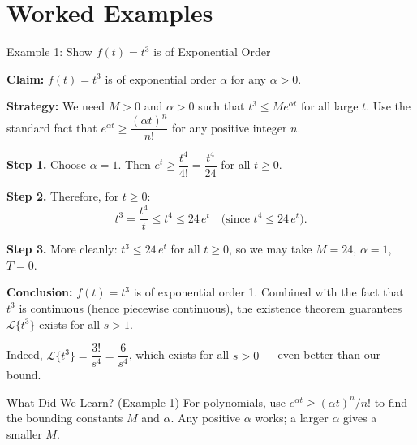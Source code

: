 \documentclass[12pt,a4paper]{article}
\begin{document}
\section{Worked Examples}

\begin{infobox}{Example 1: Show $f(t) = t^3$ is of Exponential Order}

\textbf{Claim:} $f(t) = t^3$ is of exponential order $\alpha$ for any $\alpha > 0$.

\textbf{Strategy:} We need $M > 0$ and $\alpha > 0$ such that $t^3 \leq M e^{\alpha t}$ for all large $t$. Use the standard fact that $e^{\alpha t} \geq \dfrac{(\alpha t)^n}{n!}$ for any positive integer $n$.

\textbf{Step 1.} Choose $\alpha = 1$. Then $e^{t} \geq \dfrac{t^4}{4!} = \dfrac{t^4}{24}$ for all $t \geq 0$.

\textbf{Step 2.} Therefore, for $t \geq 0$:
\[
  t^3 = \frac{t^4}{t} \leq t^4 \leq 24\, e^{t} \quad \text{(since } t^4 \leq 24\, e^t \text{)}.
\]

\textbf{Step 3.} More cleanly: $t^3 \leq 24\, e^{t}$ for all $t \geq 0$, so we may take $M = 24$, $\alpha = 1$, $T = 0$.

\textbf{Conclusion:} $f(t) = t^3$ is of exponential order 1. Combined with the fact that $t^3$ is continuous (hence piecewise continuous), the existence theorem guarantees $\mathcal{L}\{t^3\}$ exists for all $s > 1$.

Indeed, $\mathcal{L}\{t^3\} = \dfrac{3!}{s^4} = \dfrac{6}{s^4}$, which exists for all $s > 0$ --- even better than our bound.
\end{infobox}

\begin{learnbox}{What Did We Learn? (Example 1)}
For polynomials, use $e^{\alpha t} \geq (\alpha t)^n / n!$ to find the bounding constants $M$ and $\alpha$. Any positive $\alpha$ works; a larger $\alpha$ gives a smaller $M$.
\end{learnbox}
\end{document}
